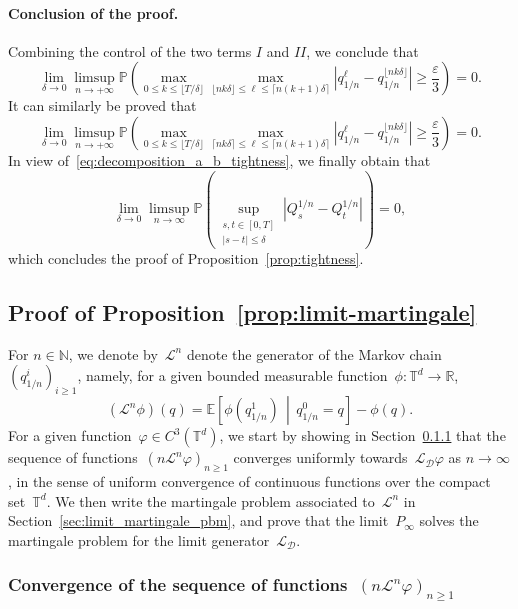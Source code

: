 \documentclass{article}
\newcommand{\cL}{\mathcal{L}}
\renewcommand{\leq}{\leqslant}
\renewcommand{\geq}{\geqslant}
\def\N{\mathbb{N}}
\def\T{\mathbb{T}}
\def\P{\mathbb{P}} %
\newcommand{\Diff}{\mathcal{D}}
\renewcommand{\dim}{d}
\newcommand{\cLD}{\cL_\Diff}
\begin{document}
\paragraph{Conclusion of the proof.} Combining the control of the two terms $I$ and $II$, we conclude that
\[
\lim_{\delta\to 0}\limsup_{n\to +\infty}\P \left( \max_{0\leq k \leq \lfloor T/\delta \rfloor}\max_{\lfloor nk\delta \rfloor \leq \ell\leq \lceil n(k+1)\delta \rceil}\left|q_{1/n}^\ell - q_{1/n}^{\lfloor nk\delta \rfloor}\right|\geq \frac{\varepsilon}{3} \right) = 0.
\]
It can similarly be proved that
\[
\lim_{\delta\to 0}\limsup_{n\to +\infty} \P \left( \max_{0\leq k \leq \lfloor T/\delta \rfloor}\max_{\lceil nk\delta \rceil \leq \ell\leq \lceil n(k+1)\delta \rceil}\left|q_{1/n}^\ell - q_{1/n}^{\lfloor nk\delta \rfloor}\right|\geq \frac{\varepsilon}{3} \right) = 0.
\]
In view of~\eqref{eq:decomposition_a_b_tightness}, we finally obtain that
\[
\lim_{\delta\to 0}\limsup_{n\to \infty} \P\left(\sup_{\substack{s,t\in[0,T]\\|s-t|\leq \delta}}  \left|Q^{1/n}_s-Q^{1/n}_t\right|\right) = 0,
\]
which concludes the proof of Proposition~\ref{prop:tightness}.

\subsection{Proof of Proposition~\ref{prop:limit-martingale}}
\label{sec:proof_prop:limit-martingale}

For $n\in\N$, we denote by~$\mathcal{L}^{n}$ denote the generator of the Markov chain~$(q_{1/n}^i)_{i \geq 1}$, namely, for a given bounded measurable function~$\phi : \T^\dim \to \mathbb{R}$, 
\begin{equation}
  \label{eq:def_Ln_varphi}
  (\mathcal{L}^n \phi)(q) = \mathbb{E}\left[ \phi(q_{1/n}^{1}) \, \middle| \, q_{1/n}^0 = q\right] - \phi(q).
\end{equation}
For a given function~$\varphi \in C^3(\T^d)$, we start by showing in Section~\ref{sec:convergence_generator_Ln} that the sequence of functions~$(n\mathcal{L}^{n}\varphi)_{n\geq 1}$ converges uniformly towards~$\cLD\varphi$ as $n\to\infty$, in the sense of uniform convergence of continuous functions over the compact set~$\T^d$. We then write the martingale problem associated to~$\mathcal{L}^n$ in Section~\ref{sec:limit_martingale_pbm}, and prove that the limit~$P_\infty$ solves the martingale problem for the limit generator~$\cLD$.

\subsubsection{Convergence of the sequence of functions~$(n\mathcal{L}^{n}\varphi)_{n\geq 1}$}
\label{sec:convergence_generator_Ln}
\end{document}
